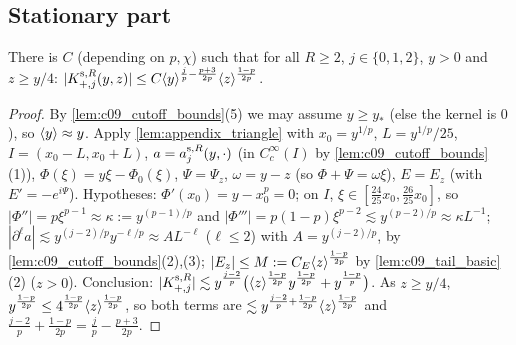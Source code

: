 \subsection{Stationary part}

\begin{lemma}
  \label{lem:c09_stationary_near}
  There is $C$ (depending on $p,\chi$) such that for all $R\ge2$, $j\in\{0,1,2\}$, $y>0$ and $z\ge y/4$:
  $|K_{+,j}^{\textup{s},R}(y,z)|\le C\langle y \rangle^{\frac jp-\frac{p+3}{2p}}\langle z \rangle^{\frac{1-p}{2p}}$.
\end{lemma}
\begin{proof}
  By \cref{lem:c09_cutoff_bounds}(5) we may assume $y\ge y_*$ (else the kernel is $0$), so $\langle y \rangle\approx y$.
  Apply \cref{lem:appendix_triangle} with $x_0=y^{1/p}$, $L=y^{1/p}/25$, $I=(x_0-L,x_0+L)$, $a=a_j^{\textup{s},R}(y,\cdot)$ (in $C^\infty_c(I)$ by
  \cref{lem:c09_cutoff_bounds}(1)), $\Phi(\xi)=y\xi-\Phi_0(\xi)$, $\Psi=\Psi_z$, $\omega=y-z$ (so $\Phi+\Psi=\omega\xi$), $E=E_z$ (with $E'=-e^{i\Psi}$).
  Hypotheses: $\Phi'(x_0)=y-x_0^p=0$; on $I$, $\xi\in[\frac{24}{25}x_0,\frac{26}{25}x_0]$, so $|\Phi''|=p\xi^{p-1}\approx\kappa:=y^{(p-1)/p}$ and
  $|\Phi'''|=p(1-p)\xi^{p-2}\lesssim y^{(p-2)/p}\approx\kappa L^{-1}$; $|\partial^\ell a|\lesssim y^{(j-2)/p}y^{-\ell/p}\approx AL^{-\ell}$ ($\ell\le2$) with
  $A=y^{(j-2)/p}$, by \cref{lem:c09_cutoff_bounds}(2),(3); $|E_z|\le M:=C_E\langle z \rangle^{\frac{1-p}{2p}}$ by \cref{lem:c09_tail_basic}(2) ($z>0$).
  Conclusion: $|K^{\textup{s},R}_{+,j}|\lesssim y^{\frac{j-2}p}\bigl(\langle z \rangle^{\frac{1-p}{2p}}y^{\frac{1-p}{2p}}+y^{\frac{1-p}p}\bigr)$. As $z\ge y/4$,
  $y^{\frac{1-p}{2p}}\le4^{\frac{1-p}{2p}}\langle z \rangle^{\frac{1-p}{2p}}$, so both terms are $\lesssim y^{\frac{j-2}p+\frac{1-p}{2p}}\langle z \rangle^{\frac{1-p}{2p}}$ and
  $\frac{j-2}{p}+\frac{1-p}{2p}=\frac jp-\frac{p+3}{2p}$.
\end{proof}

